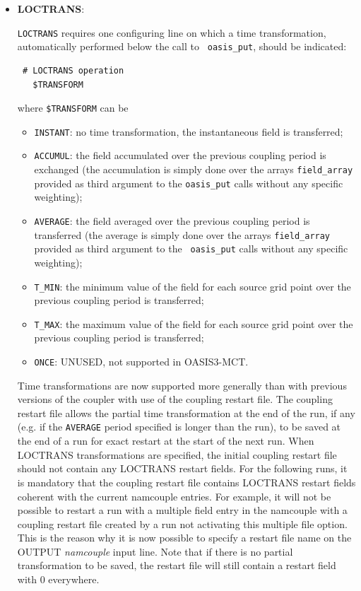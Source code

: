\begin{itemize}

\item {\bf LOCTRANS}:

  {\tt LOCTRANS} requires one configuring line on which a time
  transformation, automatically performed below the call to {\tt
    oasis\_put}, should be indicated:

  \begin{verbatim}
 # LOCTRANS operation
   $TRANSFORM
\end{verbatim}
  \vspace{-0.2cm} where {\tt \$TRANSFORM} can be
  \begin{itemize}
  \item {\tt INSTANT}: no time transformation, the instantaneous field
    is transferred;
  \item {\tt ACCUMUL}: the field accumulated over the previous
    coupling period is exchanged (the accumulation is simply done over
    the arrays {\tt field\_array} provided as third argument to the
    {\tt oasis\_put} calls without any specific weighting);
  \item {\tt AVERAGE}: the field averaged over the previous coupling
    period is transferred (the average is simply done over the arrays
    {\tt field\_array} provided as third argument to the {\tt
      oasis\_put} calls without any specific weighting);
  \item {\tt T\_MIN}: the minimum value of the field for each source
    grid point over the previous coupling period is transferred;
  \item {\tt T\_MAX}: the maximum value of the field for each source
    grid point over the previous coupling period is transferred;
  \item {\tt ONCE}: UNUSED, not supported in OASIS3-MCT.
  \end{itemize}

  Time transformations are now supported more generally
  than with previous versions of the coupler with use of the coupling restart file.  The coupling restart file
  allows the partial time transformation at the end of the run, if any
  (e.g. if the {\tt AVERAGE}
  period specified is longer than the run), to be saved at the end of a
  run for exact restart at the start of the next run. When LOCTRANS 
  transformations are specified, the initial coupling restart file
  should not contain any LOCTRANS restart fields. For the following
  runs, it is mandatory that the coupling restart file contains
  LOCTRANS restart fields coherent with the current namcouple
  entries. For example, it will not be possible to restart a run with
  a multiple field entry in the namcouple with a coupling restart file 
  created by a run not activating this multiple file option. This is
  the reason why it is now possible to specify a restart file name
  on the OUTPUT {\it namcouple} input line. Note that
  if there is no partial transformation to be saved, the restart file
  will still contain a restart field with 0 everywhere.

\end{itemize}

